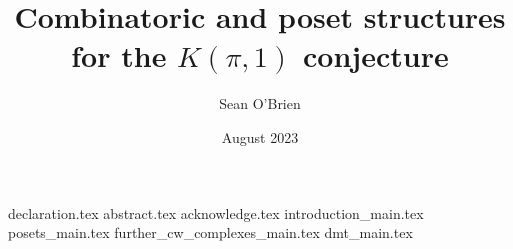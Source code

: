 \documentclass[msc]{guthesis}
\title{Combinatoric and poset structures for the $K(\pi,1)$ conjecture}
\author{Sean O'Brien}
\date{August 2023}
\begin{document}
\maketitle
{declaration.tex}
{abstract.tex}
{acknowledge.tex}
\tableofcontents
{introduction_main.tex}
{posets_main.tex}
{further_cw_complexes_main.tex}
{dmt_main.tex}




\end{document}
